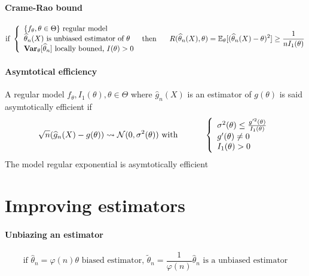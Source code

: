 \documentclass[a4paper,10pt]{article}
\begin{document}
\paragraph{Crame-Rao bound}
\[
\text{if }
\left\{
\begin{array}{l}
\{f_{\theta}, \theta \in \Theta\} \text{ regular model} \\
\widehat{\theta}_n(X) \text{ is unbiased estimator of } \theta \\
\textbf{Var}_{\theta}[\widehat{\theta}_n] \text{ locally bouned, } I(\theta) > 0 \\
\end{array}\right.
\text{ then  }
\hspace{5mm}
R(\widehat{\theta}_n(X),\theta) =
\mathbb{E}_{\theta}[(\widehat{\theta}_n(X)-\theta)^2] \geq 
\frac{1}{nI_1(\theta)}
\]
\paragraph{Asymtotical efficiency} A regular model ${f_{\theta}, I_1(\theta), \theta \in \Theta}$ where 
$\widehat{g}_n(X)$ is an estimator of $g(\theta)$ is said asymtotically efficient if
\[
\sqrt{n}(\widehat{g}_n(X) - g(\theta) )  \rightsquigarrow   \mathcal{N}(0,\sigma^{2}(\theta) ) 
\text{ with }
\hspace{10mm}
\left\{
\begin{array}{l}
\sigma^{2}(\theta) \leq \frac{g'^2(\theta)}{I_1(\theta)} \\
g'(\theta) \neq 0  \\
I_1(\theta) > 0 
\end{array}\right.
\]  
The model regular exponential is asymtotically efficient 


\section{Improving estimators}
\paragraph{Unbiazing an estimator}
\[
\text{if } \widehat{\theta}_n = \varphi(n)\theta \text{ biased estimator, }
\widetilde{\theta}_n = \frac{1}{\varphi(n)}\widehat{\theta}_n \text{ is a unbiased estimator}
\]
\end{document}
